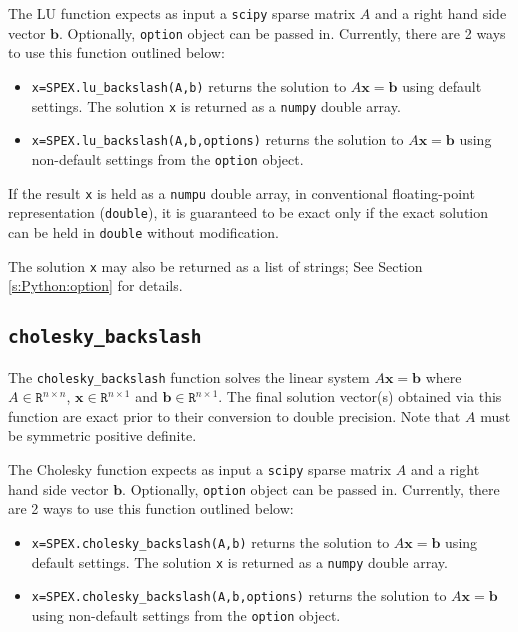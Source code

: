 \documentclass[12pt,oneside]{book}
\theoremstyle{definition}
\renewcommand{\b}{\mathbf{b}}
\newcommand{\x}{\mathbf{x}}
\begin{document}
The LU function expects as input a \verb|scipy| sparse matrix $A$ and a right hand side vector $\b$. Optionally, \verb|option| object can be passed in.
Currently, there are 2 ways to use this function outlined below:

\begin{itemize}
    \item \verb|x=SPEX.lu_backslash(A,b)| returns the solution to $A \x = \b$ using default settings. The solution \verb|x| is returned as a \verb|numpy| double array.
    \item \verb|x=SPEX.lu_backslash(A,b,options)| returns the solution to $A \x = \b$ using non-default settings from the \verb|option| object.
\end{itemize}

If the result \verb|x| is held as a \verb|numpu| double array, in conventional floating-point representation (\verb|double|), it is guaranteed to be exact only if the exact solution can be held in \verb|double| without modification.

The solution \verb|x| may also be returned as a list of strings; See Section \ref{s:Python:option} for details.


\subsection{\texttt{cholesky\_backslash}}
The \verb|cholesky_backslash| function solves the linear system $A\x=\b$ where $A \in \mathtt{R}^{n \times n}$, $\x \in \mathtt{R}^{n \times 1}$ and $\b \in \mathtt{R}^{n \times 1}$. The final solution vector(s) obtained via this function are exact prior to their conversion to double precision. Note that $A$ must be symmetric positive definite.

The Cholesky function expects as input a \verb|scipy| sparse matrix $A$ and a right hand side vector $\b$. Optionally, \verb|option| object can be passed in.
Currently, there are 2 ways to use this function outlined below:

\begin{itemize}
    \item \verb|x=SPEX.cholesky_backslash(A,b)| returns the solution to $A \x = \b$ using default settings. The solution \verb|x| is returned as a \verb|numpy| double array.
    \item \verb|x=SPEX.cholesky_backslash(A,b,options)| returns the solution to $A \x = \b$ using non-default settings from the \verb|option| object.
\end{itemize}
\end{document}
